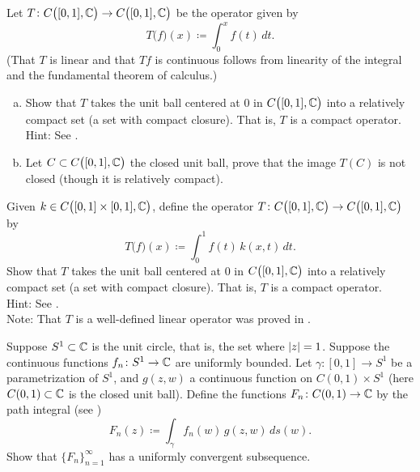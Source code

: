 \begin{exercise}
Let $T \colon C\bigl([0,1],{\mathbb{C}}\bigr) \to C\bigl([0,1],{\mathbb{C}}\bigr)$ be the operator
given by
\begin{equation*}
T\bigl(f\bigr) (x) \coloneqq \int_0^x f(t)\, dt .
\end{equation*}
(That $T$ is linear and that $Tf$ is continuous follows from
linearity of the integral and
the fundamental theorem of calculus.)
\begin{enumerate}[a)]
\item
Show that $T$ takes the unit ball centered at 0 in $C\bigl([0,1],{\mathbb{C}}\bigr)$ into a
relatively compact set (a set with compact closure).
That is, $T$ is a compact operator.\\
Hint: See .
\item
Let $C \subset C\bigl([0,1],{\mathbb{C}}\bigr)$ the closed unit ball,
prove that
the image $T(C)$ is not closed (though it is relatively compact).
\end{enumerate}
\end{exercise}

\begin{samepage}
\begin{exercise}
Given $k \in C\bigl([0,1]\times [0,1],{\mathbb{C}}\bigr)$,
define the operator
$T \colon C\bigl([0,1],{\mathbb{C}}\bigr) \to C\bigl([0,1],{\mathbb{C}}\bigr)$ by
\begin{equation*}
T\bigl(f\bigr)(x) \coloneqq  \int_0^1 f(t) \, k(x,t)\,dt .
\end{equation*}
Show that $T$ takes the unit ball centered at 0 in $C\bigl([0,1],{\mathbb{C}}\bigr)$ into a
relatively compact set (a set with compact closure).
That is, $T$ is a compact operator.\\
Hint: See .
\\
Note: That $T$ is a well-defined linear operator was proved in
.
\end{exercise}
\end{samepage}

\begin{exercise}
Suppose $S^1 \subset {\mathbb{C}}$ is the unit circle, that is, the set where
$\lvert {z} \rvert=1$.  Suppose the continuous functions
$f_n \colon S^1 \to {\mathbb{C}}$ are uniformly bounded.
Let $\gamma \colon [0,1] \to S^1$ be a parametrization of $S^1$,
and $g(z,w)$ a continuous function on $C(0,1) \times S^1$
(here $C(0,1) \subset {\mathbb{C}}$ is the closed unit ball).  Define
the functions $F_n \colon C(0,1) \to {\mathbb{C}}$ by
the path integral (see )
\begin{equation*}
F_n(z) \coloneqq \int_\gamma f_n(w)\, g(z,w) \, ds(w) . 
\end{equation*}
Show that $\{ F_n \}_{n=1}^\infty$ has a uniformly convergent subsequence.
\end{exercise}

